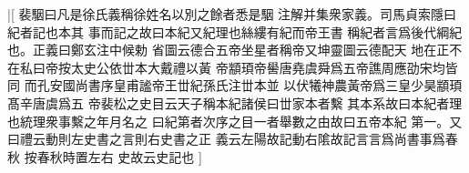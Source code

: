 |[%
裴駰曰凡是徐氏義稱徐姓名以別之餘者悉是駰%
注解并集衆家義。司馬貞索隱曰紀者記也本其%
%
事而記之故曰本紀又紀理也絲縷有紀而帝王書%
稱紀者言爲後代綱紀也。正義曰鄭玄注中候勅%
%
省圖云德合五帝坐星者稱帝又坤靈圖云德配天%
地在正不在私曰帝按太史公依丗本大戴禮以黃%
%
帝顓頊帝嚳唐堯虞舜爲五帝譙周應劭宋均皆同%
而孔安國尚書序皇甫謐帝王丗紀孫氏注丗本並%
%
以伏犧神農黃帝爲三皇少昊顓頊髙辛唐虞爲五%
帝裴松之史目云天子稱本紀諸侯曰丗家本者繫%
%
其本系故曰本紀者理也統理衆事繫之年月名之%
曰紀第者次序之目一者舉數之由故曰五帝本紀%
%
第一。又曰禮云動則左史書之言則右史書之正%
義云左陽故記動右隂故記言言爲尚書事爲春秋%
%
按春秋時置左右%
史故云史記也%
]%
